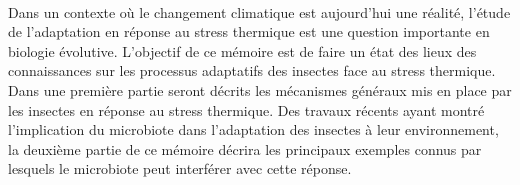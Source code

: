 \paragraph*{} %
\label{par:intro3}

Dans un contexte où le changement climatique est aujourd'hui une réalité, l'étude de l'adaptation en réponse au stress thermique est une question importante en biologie évolutive.
L'objectif de ce mémoire est de faire un état des lieux des connaissances sur les processus adaptatifs des insectes face au stress thermique.
Dans une première partie seront décrits les mécanismes généraux mis en place par les insectes en réponse au stress thermique.
Des travaux récents ayant montré l'implication du microbiote dans l'adaptation des insectes à leur environnement, la deuxième partie de ce mémoire décrira les principaux exemples connus par lesquels le microbiote peut interférer avec cette réponse.


%


